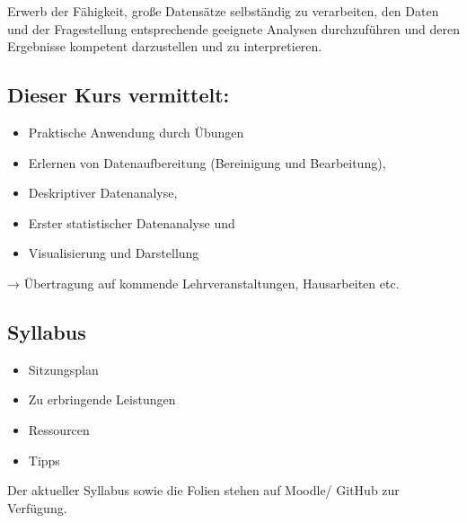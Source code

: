 \documentclass[
  custompaper,
  DIV=11,
  numbers=noendperiod]{scrartcl}
\providecommand{\tightlist}{%
  \setlength{\itemsep}{0pt}\setlength{\parskip}{0pt}}
\begin{document}
Erwerb der Fähigkeit, große Datensätze selbständig zu verarbeiten, den
Daten und der Fragestellung entsprechende geeignete Analysen
durchzuführen und deren Ergebnisse kompetent darzustellen und zu
interpretieren.

\subsection{Dieser Kurs vermittelt:}\label{dieser-kurs-vermittelt}

\begin{itemize}
\tightlist
\item
  Praktische Anwendung durch Übungen
\item
  Erlernen von Datenaufbereitung (Bereinigung und Bearbeitung),
\item
  Deskriptiver Datenanalyse,
\item
  Erster statistischer Datenanalyse und
\item
  Visualisierung und Darstellung
\end{itemize}

→ Übertragung auf kommende Lehrveranstaltungen, Hausarbeiten etc.

\subsection{Syllabus}\label{syllabus}

\begin{itemize}
\tightlist
\item
  Sitzungsplan
\item
  Zu erbringende Leistungen
\item
  Ressourcen
\item
  Tipps
\end{itemize}

\begin{tcolorbox}[enhanced jigsaw, arc=.35mm, titlerule=0mm, breakable, toprule=.15mm, opacityback=0, left=2mm, title=\textcolor{quarto-callout-important-color}{\faExclamation}\hspace{0.5em}{Wichtig}, colbacktitle=quarto-callout-important-color!10!white, opacitybacktitle=0.6, toptitle=1mm, bottomtitle=1mm, colframe=quarto-callout-important-color-frame, coltitle=black, rightrule=.15mm, bottomrule=.15mm, leftrule=.75mm, colback=white]

Der aktueller Syllabus sowie die Folien stehen auf Moodle/ GitHub zur
Verfügung.

\end{tcolorbox}
\end{document}
